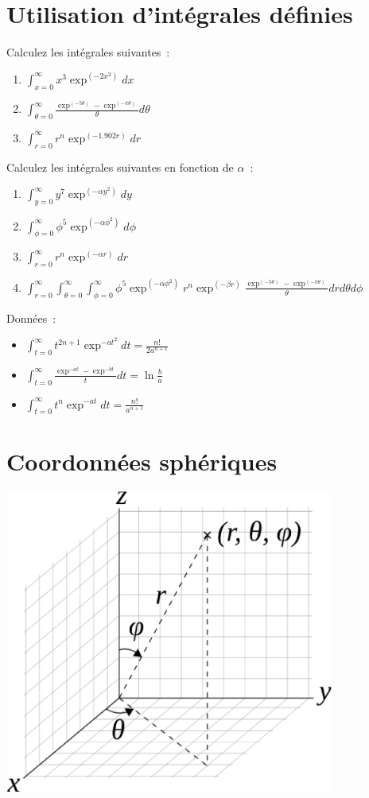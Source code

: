 \documentclass{article}
\begin{document}
\newcommand{\exercice}[1]{\section{#1}}
\exercice{Utilisation d'int\'egrales d\'efinies}
Calculez les int\'egrales suivantes~:
\begin{enumerate}
\item $\displaystyle \int_{x=0}^\infty x^3\exp^{(-2x^2)}dx$
\item $\displaystyle \int_{\theta=0}^\infty \frac{\exp^{(-5\theta)}-\exp^{(-\pi\theta)}}{\theta} d\theta$
\item $\displaystyle \int_{r=0}^\infty r^n\exp^{(-1.902r)}dr$
\end{enumerate}
Calculez les int\'egrales suivantes en fonction de $\alpha$~:
\begin{enumerate}
\item $\displaystyle \int_{y=0}^\infty y^7\exp^{(-\alpha y^2)}dy$
\item $\displaystyle \int_{\phi=0}^\infty \phi^{5}\exp^{(-\alpha\phi^2)}d\phi$
\item $\displaystyle \int_{r=0}^\infty r^n\exp^{(-\alpha r)}dr$
\item $\displaystyle \int_{r=0}^\infty\int_{\theta=0}^\infty\int_{\phi=0}^\infty \phi^{5}\exp^{(-\alpha\phi^2)}r^n\exp^{(-\beta r)} \frac{\exp^{(-5\theta)}-\exp^{(-\pi\theta)}}{\theta} drd\theta d\phi$
\end{enumerate}
Donn\'ees~:
\begin{itemize}
\item $\displaystyle \int_{t=0}^\infty t^{2n+1}\exp^{-at^2}dt = \frac{n!}{2a^{n+1}}$
\item $\displaystyle \int_{t=0}^\infty \frac{\exp^{-at} - \exp^{-bt}}{t}dt = \ln\frac{b}{a}$
\item $\displaystyle \int_{t=0}^\infty t^n\exp^{-at}dt = \frac{n!}{a^{n+1}}$
\end{itemize}
\exercice{Coordonn\'ees sph\'eriques}
\includegraphics[height=10cm]{spheriques.eps}\\
\end{document}
